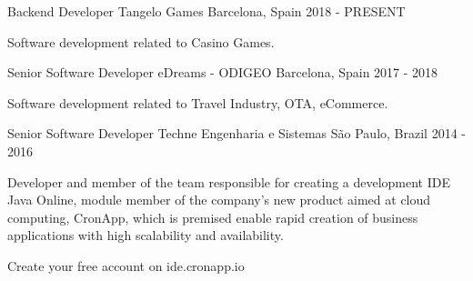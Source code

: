 

\begin{cventries}

  \cventry
    {Backend Developer} %
    {Tangelo Games} %
    {Barcelona, Spain} %
    {2018 - PRESENT} %
    {
      \begin{cvitems} %
        \item {Software development related to Casino Games.}
      \end{cvitems}
    }

  \cventry
    {Senior Software Developer} %
    {eDreams - ODIGEO} %
    {Barcelona, Spain} %
    {2017 - 2018} %
    {
      \begin{cvitems} %
        \item {Software development related to Travel Industry, OTA, eCommerce.}
      \end{cvitems}
    }

  \cventry
    {Senior Software Developer} %
    {Techne Engenharia e Sistemas} %
    {São Paulo, Brazil} %
    {2014 - 2016} %
    {
      \begin{cvitems} %
        \item {Developer and member of the team responsible for creating a development IDE Java Online, module member of the company's new product aimed at cloud computing, CronApp, which is premised enable rapid creation of business applications with high scalability and availability.}
        \item {Create your free account on ide.cronapp.io}
      \end{cvitems}
    }


\end{cventries}
